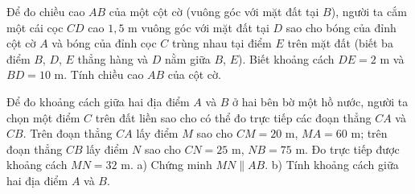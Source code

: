 \begin{bt}%
	Để đo chiều cao $AB$ của một cột cờ (vuông góc với mặt đất tại $B$), người ta cắm một cái cọc $CD$ cao $1{,}5\text{ m}$ vuông góc với mặt đất tại $D$ sao cho bóng của đỉnh cột cờ $A$ và bóng của đỉnh cọc $C$ trùng nhau tại điểm $E$ trên mặt đất (biết ba điểm $B$, $D$, $E$ thẳng hàng và $D$ nằm giữa $B$, $E$). Biết khoảng cách $DE = 2\text{ m}$ và $BD = 10\text{ m}$. Tính chiều cao $AB$ của cột cờ.
\end{bt}

\begin{bt}%
	Để đo khoảng cách giữa hai địa điểm $A$ và $B$ ở hai bên bờ một hồ nước, người ta chọn một điểm $C$ trên đất liền sao cho có thể đo trực tiếp các đoạn thẳng $CA$ và $CB$. Trên đoạn thẳng $CA$ lấy điểm $M$ sao cho $CM = 20\text{ m}$, $MA = 60\text{ m}$; trên đoạn thẳng $CB$ lấy điểm $N$ sao cho $CN = 25\text{ m}$, $NB = 75\text{ m}$. Đo trực tiếp được khoảng cách $MN = 32\text{ m}$.
a) Chứng minh $MN \parallel AB$.
b) Tính khoảng cách giữa hai địa điểm $A$ và $B$.
\end{bt}
